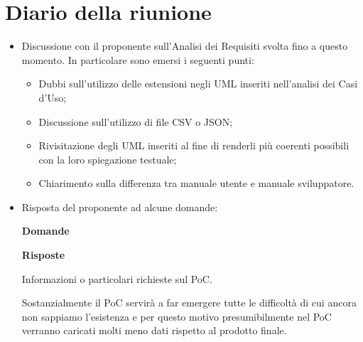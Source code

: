 \section{Diario della riunione}
\begin{itemize}
  \item Discussione con il proponente sull'Analisi dei Requisiti svolta fino a questo momento. In particolare sono emersi i seguenti punti:
  \begin{itemize}
    \item Dubbi sull'utilizzo delle estensioni negli UML inseriti nell'analisi dei Casi d'Uso;
    \item Discussione sull'utilizzo di file CSV o JSON;
    \item Rivisitazione degli UML inseriti al fine di renderli più coerenti possibili con la loro spiegazione testuale;
    \item Chiarimento sulla differenza tra manuale utente e manuale sviluppatore.
  \end{itemize}
  \item Risposta del proponente ad alcune domande:

  \begin{spacing}{2}
  \end{spacing}

  \begin{minipage}[b]{0.47\textwidth}
  \centering
  \textbf{Domande}
  \end{minipage}
  \hfill
  \begin{minipage}[b]{0.47\textwidth}
  \centering
  \textbf{Risposte}
  \end{minipage}

  \begin{spacing}{3}
  \end{spacing}

  \begin{minipage}[c]{0.47\textwidth}
  \centering
  Informazioni o particolari richieste sul PoC.
  \end{minipage}
  \hfill
  \begin{minipage}[c]{0.47\textwidth}
  \centering
  Sostanzialmente il PoC servirà a far emergere tutte le difficoltà di cui ancora non sappiamo l'esistenza e per questo motivo presumibilmente nel PoC verranno caricati molti meno dati rispetto al prodotto finale.
  \end{minipage}

  \begin{spacing}{3}
  \end{spacing}


\end{itemize}
